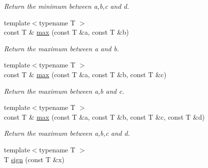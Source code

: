 \begin{DoxyCompactItemize}
\begin{DoxyCompactList}\small\item\em Return the minimum between {\ttfamily a},{\ttfamily b},{\ttfamily c} and {\ttfamily d}. \end{DoxyCompactList}\item 
\hypertarget{namespacecimg__library_1_1cimg_ae84548c45d9e5878954602914d34babe}{{\footnotesize template$<$typename T $>$ }\\const T \& \hyperlink{namespacecimg__library_1_1cimg_ae84548c45d9e5878954602914d34babe}{max} (const T \&a, const T \&b)}\label{namespacecimg__library_1_1cimg_ae84548c45d9e5878954602914d34babe}

\begin{DoxyCompactList}\small\item\em Return the maximum between {\ttfamily a} and {\ttfamily b}. \end{DoxyCompactList}\item 
\hypertarget{namespacecimg__library_1_1cimg_a5cd91c6abe82bc32dbabb29652ee2996}{{\footnotesize template$<$typename T $>$ }\\const T \& \hyperlink{namespacecimg__library_1_1cimg_a5cd91c6abe82bc32dbabb29652ee2996}{max} (const T \&a, const T \&b, const T \&c)}\label{namespacecimg__library_1_1cimg_a5cd91c6abe82bc32dbabb29652ee2996}

\begin{DoxyCompactList}\small\item\em Return the maximum between {\ttfamily a},{\ttfamily b} and {\ttfamily c}. \end{DoxyCompactList}\item 
\hypertarget{namespacecimg__library_1_1cimg_aba7d6417b2087aea13e0949d65d2a043}{{\footnotesize template$<$typename T $>$ }\\const T \& \hyperlink{namespacecimg__library_1_1cimg_aba7d6417b2087aea13e0949d65d2a043}{max} (const T \&a, const T \&b, const T \&c, const T \&d)}\label{namespacecimg__library_1_1cimg_aba7d6417b2087aea13e0949d65d2a043}

\begin{DoxyCompactList}\small\item\em Return the maximum between {\ttfamily a},{\ttfamily b},{\ttfamily c} and {\ttfamily d}. \end{DoxyCompactList}\item 
\hypertarget{namespacecimg__library_1_1cimg_af2c2359156b93cc14c901f316728538e}{{\footnotesize template$<$typename T $>$ }\\T \hyperlink{namespacecimg__library_1_1cimg_af2c2359156b93cc14c901f316728538e}{sign} (const T \&x)}\label{namespacecimg__library_1_1cimg_af2c2359156b93cc14c901f316728538e}


\end{DoxyCompactItemize}
